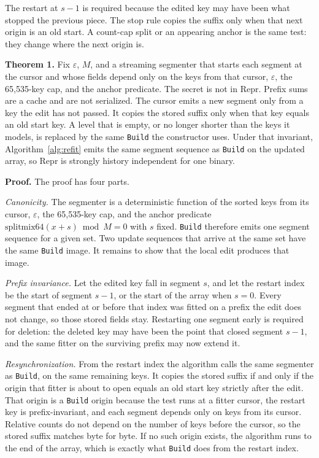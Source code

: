 \documentclass[conference]{IEEEtran}
\begin{document}
The restart at $s-1$ is required because the edited key may have been what stopped the previous piece.
The stop rule copies the suffix only when that next origin is an old start.
A count-cap split or an appearing anchor is the same test: they change where the next origin is.

\textbf{Theorem 1.}
Fix $\varepsilon$, $M$, and a streaming segmenter that starts each segment at the cursor and whose fields depend only on the keys from that cursor, $\varepsilon$, the 65{,}535-key cap, and the anchor predicate.
The secret is not in $\mathrm{Repr}$. Prefix sums are a cache and are not serialized.
The cursor emits a new segment only from a key the edit has not passed.
It copies the stored suffix only when that key equals an old start key.
A level that is empty, or no longer shorter than the keys it models, is replaced by the same \texttt{Build} the constructor uses.
Under that invariant, Algorithm~\ref{alg:refit} emits the same segment sequence as \texttt{Build} on the updated array, so $\mathrm{Repr}$ is strongly history independent for one binary.

\textbf{Proof.}
The proof has four parts.

\emph{Canonicity.}
The segmenter is a deterministic function of the sorted keys from its cursor, $\varepsilon$, the 65{,}535-key cap, and the anchor predicate $\mathrm{splitmix64}(x+s)\bmod M=0$ with $s$ fixed.
\texttt{Build} therefore emits one segment sequence for a given set.
Two update sequences that arrive at the same set have the same \texttt{Build} image.
It remains to show that the local edit produces that image.

\emph{Prefix invariance.}
Let the edited key fall in segment $s$, and let the restart index be the start of segment $s-1$, or the start of the array when $s=0$.
Every segment that ended at or before that index was fitted on a prefix the edit does not change, so those stored fields stay.
Restarting one segment early is required for deletion: the deleted key may have been the point that closed segment $s-1$, and the same fitter on the surviving prefix may now extend it.

\emph{Resynchronization.}
From the restart index the algorithm calls the same segmenter as \texttt{Build}, on the same remaining keys.
It copies the stored suffix if and only if the origin that fitter is about to open equals an old start key strictly after the edit.
That origin is a \texttt{Build} origin because the test runs at a fitter cursor, the restart key is prefix-invariant, and each segment depends only on keys from its cursor.
Relative counts do not depend on the number of keys before the cursor, so the stored suffix matches byte for byte.
If no such origin exists, the algorithm runs to the end of the array, which is exactly what \texttt{Build} does from the restart index.
\end{document}
